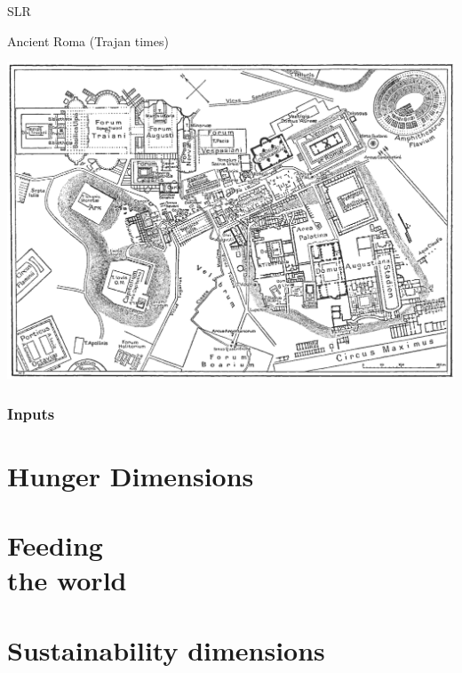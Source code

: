 \documentclass[print,Draft]{faosyb}
\begin{document}
\begin{map}{S}{LR}
\caption{Ancient Roma  (Trajan times)}
\label{map:roma}
\includegraphics[width=\chartwidth,height=\chartheight]{Rome}
\end{map}

\lipsum






\begin{tablepages}
\section{Inputs}
\small
  
\clearpage

\end{tablepages}

\part{Hunger Dimensions}
\lipsum
\EndPartIntro
\lipsum[1-2]

\part[Feeding the world]{Feeding\\ the world}
\lipsum
\EndPartIntro

\lipsum[2-12]

\part[Sustainability dimensions]{Sustain\-ability dimensions}
\lipsum
\EndPartIntro
\end{document}
